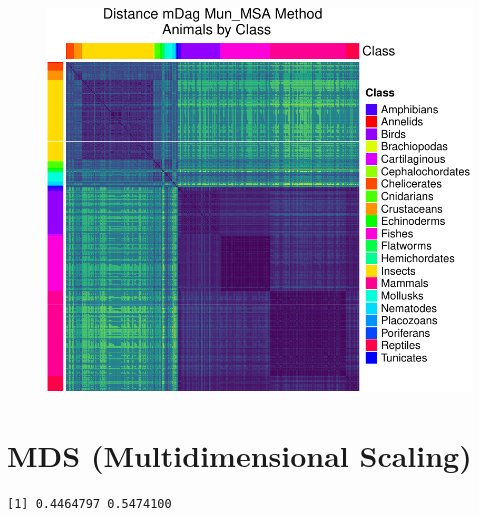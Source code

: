 \documentclass[
  letterpaper,
  DIV=11,
  numbers=noendperiod]{scrreprt}
\newenvironment{Shaded}{\begin{snugshade}}{\end{snugshade}}
\newcommand{\AttributeTok}[1]{\textcolor[rgb]{0.40,0.45,0.13}{#1}}
\newcommand{\CommentTok}[1]{\textcolor[rgb]{0.37,0.37,0.37}{#1}}
\newcommand{\ConstantTok}[1]{\textcolor[rgb]{0.56,0.35,0.01}{#1}}
\newcommand{\DecValTok}[1]{\textcolor[rgb]{0.68,0.00,0.00}{#1}}
\newcommand{\DocumentationTok}[1]{\textcolor[rgb]{0.37,0.37,0.37}{\textit{#1}}}
\newcommand{\FunctionTok}[1]{\textcolor[rgb]{0.28,0.35,0.67}{#1}}
\newcommand{\NormalTok}[1]{\textcolor[rgb]{0.00,0.23,0.31}{#1}}
\newcommand{\OtherTok}[1]{\textcolor[rgb]{0.00,0.23,0.31}{#1}}
\newcommand{\SpecialCharTok}[1]{\textcolor[rgb]{0.37,0.37,0.37}{#1}}
\begin{document}
\begin{figure}[H]

{\centering \includegraphics{./data_medag_20230321_long_report_files/figure-pdf/unnamed-chunk-16-1.pdf}

}

\end{figure}

\hypertarget{mds-multidimensional-scaling-1}{%
\section{MDS (Multidimensional
Scaling)}\label{mds-multidimensional-scaling-1}}

\begin{Shaded}
\end{Shaded}

\begin{verbatim}
[1] 0.4464797 0.5474100
\end{verbatim}
\end{document}
